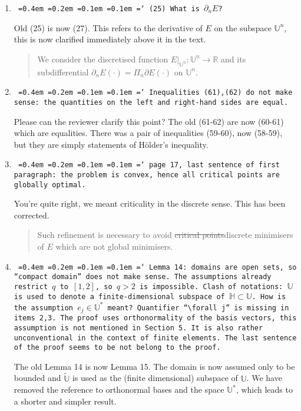 \documentclass[12pt]{article}
\newcommand*\justify{%
	\fontdimen2\font=0.4em%
	\fontdimen3\font=0.2em%
	\fontdimen4\font=0.1em%
	\fontdimen7\font=0.1em%
	\hyphenchar\font=`\-%
}
\newcommand{\review}[1]{\texttt{\justify{#1}}}
\newcommand{\F}[1]{\mathbb{#1}}
\newcommand{\edit}[2]{{\color{red}\sout{#1}}{\color{darkgreen}#2}}
\begin{document}
\begin{enumerate}
	\item \review{(25) What is $\partial_n E$?}
	
	Old (25) is now (27). This refers to the derivative of $E$ on the subspace $\F U^n$, this is now clarified immediately above it in the text.
	\begin{quote}
		\edit{}{We consider the discretised function $E|_{\F{U}^n}\colon \F{U}^n\to\F R$ and its subdifferential $\partial_nE(\cdot) = \Pi_n\partial E(\cdot)$ on $\F{U}^n$.} 
	\end{quote}
	
	\item \review{Inequalities (61),(62) do not make sense: the quantities on the left and right-hand sides are equal.}
	
	Please can the reviewer clarify this point? The old (61-62) are now (60-61) which are equalities. There was a pair of inequalities (59-60), now (58-59), but they are simply statements of H\"older's inequality.
	
	\item \review{page 17, last sentence of first paragraph: the problem is convex, hence all critical points are globally optimal.}
	
	You're quite right, we meant criticality in the discrete sense. This has been corrected.
	\begin{quote}
		Such refinement is necessary to avoid \edit{critical points}{discrete minimisers} of $E$ which are not global minimisers.
	\end{quote}
	
	\item \review{Lemma 14: domains are open sets, so ``compact domain'' does not make sense. The assumptions already restrict $q$ to $[1, 2]$, so $q > 2$ is impossible. Clash of notations: $\mathbb U$ is used to denote a finite-dimensional subspace of $\mathbb H \subset \mathbb U$. How is the assumption $e_j \in \mathbb U^*$ meant? Quantifier ``$\forall j$'' is missing in items 2,3. The proof uses orthonormality of the basis vectors, this assumption is not mentioned in Section 5. It is also rather unconventional in the context of finite elements. The last sentence of the proof seems to be not belong to the proof.}
	
	The old Lemma 14 is now Lemma 15. The domain is now assumed only to be bounded and $\tilde{\F{U}}$ is used as the (finite dimensional) subspace of $\F U$. We have removed the reference to orthonormal bases and the space $\F{U}^*$, which leads to a shorter and simpler result. 
		

\end{enumerate}
\end{document}
